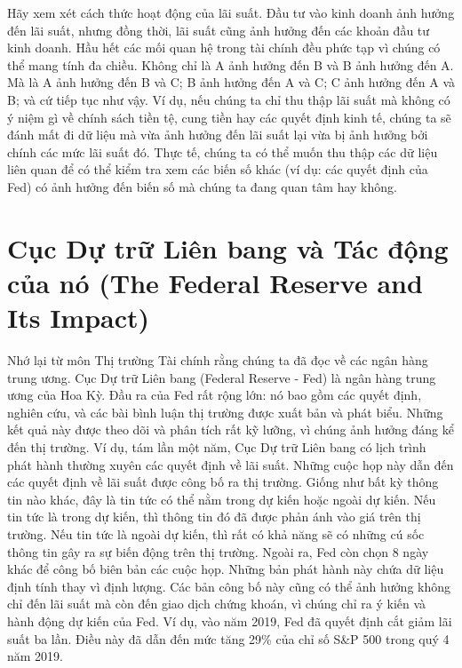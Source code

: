 Hãy xem xét cách thức hoạt động của lãi suất. Đầu tư vào kinh doanh ảnh hưởng đến lãi suất, nhưng đồng thời, lãi suất cũng ảnh hưởng đến các khoản đầu tư kinh doanh. Hầu hết các mối quan hệ trong tài chính đều phức tạp vì chúng có thể mang tính đa chiều. Không chỉ là A ảnh hưởng đến B và B ảnh hưởng đến A. Mà là A ảnh hưởng đến B và C; B ảnh hưởng đến A và C; C ảnh hưởng đến A và B; và cứ tiếp tục như vậy. Ví dụ, nếu chúng ta chỉ thu thập lãi suất mà không có ý niệm gì về chính sách tiền tệ, cung tiền hay các quyết định kinh tế, chúng ta sẽ đánh mất đi dữ liệu mà vừa ảnh hưởng đến lãi suất lại vừa bị ảnh hưởng bởi chính các mức lãi suất đó. Thực tế, chúng ta có thể muốn thu thập các dữ liệu liên quan để có thể kiểm tra xem các biến số khác (ví dụ: các quyết định của Fed) có ảnh hưởng đến biến số mà chúng ta đang quan tâm hay không.

\section[Cục Dự trữ Liên bang và Tác động của nó]{Cục Dự trữ Liên bang và Tác động của nó (The Federal Reserve and Its Impact)}

Nhớ lại từ môn Thị trường Tài chính rằng chúng ta đã đọc về các ngân hàng trung ương. Cục Dự trữ Liên bang (Federal Reserve - Fed) là ngân hàng trung ương của Hoa Kỳ. Đầu ra của Fed rất rộng lớn: nó bao gồm các quyết định, nghiên cứu, và các bài bình luận thị trường được xuất bản và phát biểu. Những kết quả này được theo dõi và phân tích rất kỹ lưỡng, vì chúng ảnh hưởng đáng kể đến thị trường. Ví dụ, tám lần một năm, Cục Dự trữ Liên bang có lịch trình phát hành thường xuyên các quyết định về lãi suất. Những cuộc họp này dẫn đến các quyết định về lãi suất được công bố ra thị trường. Giống như bất kỳ thông tin nào khác, đây là tin tức có thể nằm trong dự kiến hoặc ngoài dự kiến. Nếu tin tức là trong dự kiến, thì thông tin đó đã được phản ánh vào giá trên thị trường. Nếu tin tức là ngoài dự kiến, thì rất có khả năng sẽ có những cú sốc thông tin gây ra sự biến động trên thị trường. Ngoài ra, Fed còn chọn 8 ngày khác để công bố biên bản các cuộc họp. Những bản phát hành này chứa dữ liệu định tính thay vì định lượng. Các bản công bố này cũng có thể ảnh hưởng không chỉ đến lãi suất mà còn đến giao dịch chứng khoán, vì chúng chỉ ra ý kiến và hành động dự kiến của Fed. Ví dụ, vào năm 2019, Fed đã quyết định cắt giảm lãi suất ba lần. Điều này đã dẫn đến mức tăng 29\% của chỉ số S\&P 500 trong quý 4 năm 2019.

